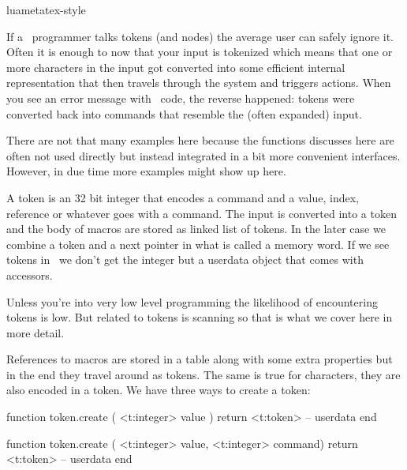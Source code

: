 
\environment luametatex-style

\startdocument[title=Tokens]

\startsection[title={Introduction}]

If a \TEX\ programmer talks tokens (and nodes) the average user can safely ignore
it. Often it is enough to now that your input is tokenized which means that one
or more characters in the input got converted into some efficient internal
representation that then travels through the system and triggers actions. When
you see an error message with \TEX\ code, the reverse happened: tokens were
converted back into commands that resemble the (often expanded) input.

There are not that many examples here because the functions discusses here are
often not used directly but instead integrated in a bit more convenient
interfaces. However, in due time more examples might show up here.

\stopsection

\startsection[title={\LUA\ token representation}]

A token is an 32 bit integer that encodes a command and a value, index, reference
or whatever goes with a command. The input is converted into a token and the body
of macros are stored as linked list of tokens. In the later case we combine a
token and a next pointer in what is called a memory word. If we see tokens in
\LUA\ we don't get the integer but a userdata object that comes with accessors.

Unless you're into very low level programming the likelihood of encountering
tokens is low. But related to tokens is scanning so that is what we cover here in
more detail.

\stopsection

\startsection[title={Helpers}]

\startsubsection[title={Basics}]

References to macros are stored in a table along with some extra properties but
in the end they travel around as tokens. The same is true for characters, they
are also encoded in a token. We have three ways to create a token:

\starttyping[option=LUA]
function token.create ( <t:integer> value )
    return <t:token> -- userdata
end

function token.create ( <t:integer> value, <t:integer> command)
    return <t:token> -- userdata
end

